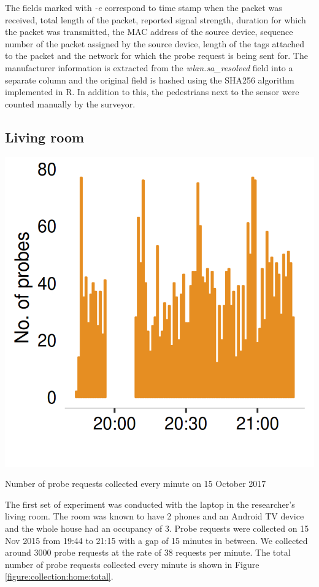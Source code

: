 The fields marked with \textit{-e} correspond to time stamp when the packet was received, total length of the packet, reported signal strength, duration for which the packet was transmitted, the MAC address of the source device, sequence number of the packet assigned by the source device, length of the tags attached to the packet and the network for which the probe request is being sent for.
The manufacturer information is extracted from the \textit{wlan.sa\_resolved} field into a separate column and the original field is hashed using the SHA256 algorithm implemented in R.
In addition to this, the pedestrians next to the sensor were counted manually by the surveyor.

\subsection{Living room}

\begin{marginfigure}
  \forcerectofloat
  \includegraphics{images/home-total-count.png}
  \caption{Number of probe requests collected every minute on 15 October 2017}
  \label{figure:collection:home:total}
\end{marginfigure}

The first set of experiment was conducted with the laptop in the researcher's living room. 
The room was known to have 2 phones and an Android TV device and the whole house had an occupancy of 3.
Probe requests were collected on 15 Nov 2015 from 19:44 to 21:15 with a gap of 15 minutes in between.
We collected around 3000 probe requests at the rate of 38 requests per minute.
The total number of probe requests collected every minute is shown in Figure \ref{figure:collection:home:total}.

